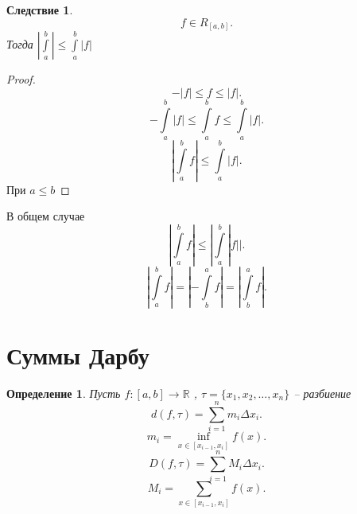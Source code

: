 \documentclass{scrartcl}
\newtheorem{definition}{Определение}
\newtheorem{corollary}{Следствие}[theorem]
\begin{document}
\begin{corollary}
    \[
        f \in R_{[a,b]}
    .\] 
    Тогда $|\int\limits_{a}^{b}|  \le  \int\limits_{a}^{b}  |f|$
\end{corollary}
\begin{proof}
    \[
    -|f| \le  f \le |f|
    .\] 
    \[
    -\int\limits_{a}^{b}  |f|  \le  \int\limits_{a}^{b} f \le  \int\limits_{a}^{b} |f| 
    .\] 
    \[
    |\int\limits_{a}^{b} f | \le \int\limits_{a}^{b} |f| 
    .\] 
    При $a \le  b$
\end{proof}
В общем случае
\[
|\int\limits_{a}^{b} f| \le  |\int\limits_{a}^{b} |f| | 
.\] 
\[
|\int\limits_{a}^{b} f| = | -\int\limits_{b}^{a} f|  = |\int\limits_{b}^{a}  f|
.\] 
\section{Суммы Дарбу}
\begin{definition}
    Пусть $f : [a,b] \to \mathbb{R}$ , $\tau = \{x_1,x_2,\dots,x_{n}\}$ -- разбиение 
    \[
    d(f,\tau) = \sum_{i = 1}^{n} m_{i} \Delta x_{i}
    .\] 
    \[
        m_{i}= \inf_{x \in [x_{i - 1},x_{i}]} f(x)
    .\] 
    \[
    D(f,\tau) = \sum_{i = 1}^{n} M_{i} \Delta x_{i}
    .\] 
    \[
        M_{i} = \sum_{x \in [x_{i-1},x_{i}]} f(x)
    .\] 
\end{definition}
\end{document}
